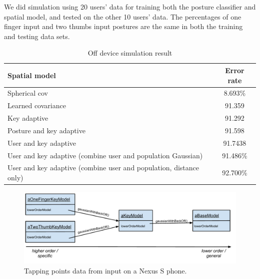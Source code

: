 \documentclass{sigchi}
\newcommand\tabhead[1]{\small\textbf{#1}}
\begin{document}
We did simulation using 20 users' data for training both the posture
classifier and spatial model, and tested on the other 10 users' data. The
percentages of one finger input and two thumbs input postures are the same in
both the training and testing data sets.

\begin{table}[tb]
  \centering
  \begin{tabularx}{\columnwidth}{|X|c|}
  \hline
  \tabhead{Spatial model} & \tabhead{Error rate} \\
  \hline
  Spherical cov & 8.693\% \\
  \hline
  Learned covariance & 91.359 \\
  \hline
  Key adaptive  & 91.292 \\
  \hline
  Posture and key adaptive  & 91.598 \\
  \hline
  User and key adaptive & 91.7438 \\
  \hline
  User and key adaptive (combine user and population Gaussian)  & 91.486\% \\
  \hline
  User and key adaptive (combine user and population, distance only) &  92.700\%
  \\
  \hline
  \end{tabularx}
  \caption{Off device simulation result}
  \label{tab:off-device}
\end{table}

\begin{figure}[tb]
  \centering
  \includegraphics[width=1\columnwidth]{figures/chain-of-responsibility.pdf}
  \caption{Tapping points data from input on a Nexus S phone.}
  \label{fig:time-distance}
\end{figure}
\end{document}
